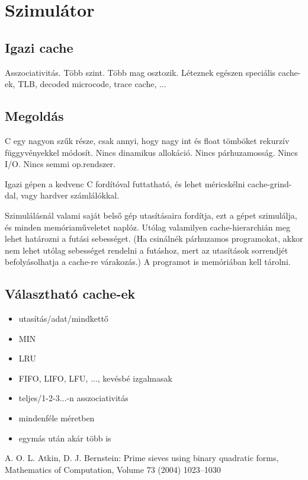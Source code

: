 \documentclass[12pt]{report}
\begin{document}
\chapter{Szimulátor}

\section{Igazi cache}

Asszociativitás. Több szint. Több mag osztozik. Léteznek egészen speciális cache-ek, TLB, decoded microcode, trace cache, ...

\section{Megoldás}

C egy nagyon szűk része, csak annyi, hogy nagy int és float tömböket rekurzív függyvényekkel módosít. Nincs dinamikus allokáció. Nincs párhuzamosság. Nincs I/O. Nincs semmi op.rendszer.

Igazi gépen a kedvenc C fordítóval futtatható, és lehet méricskélni cache-grind-dal, vagy hardver számlálókkal.

Szimulálásnál valami saját belső gép utasításaira fordítja, ezt a gépet szimulálja, és minden memóriaműveletet naplóz. Utólag valamilyen cache-hierarchián meg lehet határozni a futási sebességet. (Ha csinálnék párhuzamos programokat, akkor nem lehet utólag sebességet rendelni a futáshoz, mert az utasítások sorrendjét befolyásolhatja a cache-re várakozás.)
A programot is memóriában kell tárolni.

\section{Választható cache-ek}

\begin{itemize}
\item utasítás/adat/mindkettő
\item MIN
\item LRU
\item FIFO, LIFO, LFU, ..., kevésbé izgalmasak
\item teljes/1-2-3...-n asszociativitás
\item mindenféle méretben
\item egymás után akár több is
\end{itemize}

\begin{thebibliography}{9}

A. O. L. Atkin, D. J. Bernstein: Prime sieves using binary quadratic forms, Mathematics of Computation, Volume 73 (2004) 1023–1030

\end{thebibliography}
\end{document}
